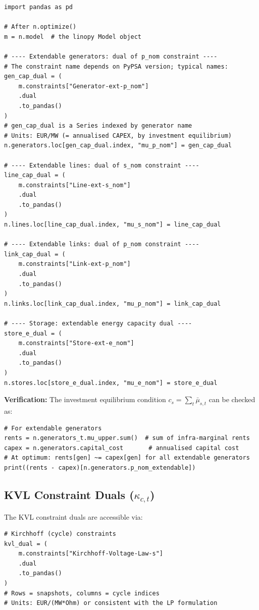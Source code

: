 \documentclass{article}
\begin{document}
\begin{lstlisting}[caption={Extracting capacity KKT multipliers from linopy}]
import pandas as pd

# After n.optimize()
m = n.model  # the linopy Model object

# ---- Extendable generators: dual of p_nom constraint ----
# The constraint name depends on PyPSA version; typical names:
gen_cap_dual = (
    m.constraints["Generator-ext-p_nom"]
    .dual
    .to_pandas()
)
# gen_cap_dual is a Series indexed by generator name
# Units: EUR/MW (= annualised CAPEX, by investment equilibrium)
n.generators.loc[gen_cap_dual.index, "mu_p_nom"] = gen_cap_dual

# ---- Extendable lines: dual of s_nom constraint ----
line_cap_dual = (
    m.constraints["Line-ext-s_nom"]
    .dual
    .to_pandas()
)
n.lines.loc[line_cap_dual.index, "mu_s_nom"] = line_cap_dual

# ---- Extendable links: dual of p_nom constraint ----
link_cap_dual = (
    m.constraints["Link-ext-p_nom"]
    .dual
    .to_pandas()
)
n.links.loc[link_cap_dual.index, "mu_p_nom"] = link_cap_dual

# ---- Storage: extendable energy capacity dual ----
store_e_dual = (
    m.constraints["Store-ext-e_nom"]
    .dual
    .to_pandas()
)
n.stores.loc[store_e_dual.index, "mu_e_nom"] = store_e_dual
\end{lstlisting}

\textbf{Verification:} The investment equilibrium condition $c_s = \sum_t \bar{\mu}_{s,t}$
can be checked as:
\begin{lstlisting}[caption={Checking investment equilibrium}]
# For extendable generators
rents = n.generators_t.mu_upper.sum()  # sum of infra-marginal rents
capex = n.generators.capital_cost       # annualised capital cost
# At optimum: rents[gen] ~= capex[gen] for all extendable generators
print((rents - capex)[n.generators.p_nom_extendable])
\end{lstlisting}

\subsection{KVL Constraint Duals ($\kappa_{c,t}$)}

The KVL constraint duals are accessible via:
\begin{lstlisting}[caption={Extracting KVL (Kirchhoff) constraint duals}]
# Kirchhoff (cycle) constraints
kvl_dual = (
    m.constraints["Kirchhoff-Voltage-Law-s"]
    .dual
    .to_pandas()
)
# Rows = snapshots, columns = cycle indices
# Units: EUR/(MW*Ohm) or consistent with the LP formulation
\end{lstlisting}
\end{document}
